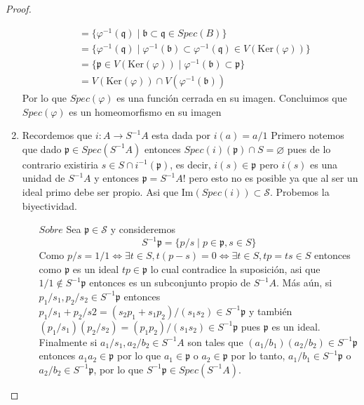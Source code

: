 \documentclass[14pt]{extarticle}
\begin{document}
\begin{proof}
\begin{enumerate}
\begin{align*}
            &=\{\varphi^{-1}(\mathfrak{q})\mid \mathfrak{b}\subset \mathfrak{q}\in Spec(B)\}\\
            &= \{\varphi^{-1}(\mathfrak{q})\mid \varphi^{-1}(\mathfrak{b}) \subset \varphi^{-1}(\mathfrak{q})\in V(\mbox{Ker}(\varphi))\}\\
            &= \{\mathfrak{p}\in V(\mbox{Ker}(\varphi))\mid \varphi^{-1}(\mathfrak{b}) \subset \mathfrak{p}\}\\
            &= V(\mbox{Ker}(\varphi))\cap V(\varphi^{-1}(\mathfrak{b}))
        \end{align*}
        Por lo que $Spec(\varphi)$ es una función cerrada en su imagen.
        Concluimos que $Spec(\varphi)$ es un homeomorfismo en su imagen
        \item Recordemos que $i:A\rightarrow S^{-1}A$ esta dada por $i(a)=a/1$ 
        Primero notemos que dado $\mathfrak{p}\in Spec(S^{-1}A)$ entonces
        $Spec(i)(\mathfrak{p})\cap S= \varnothing$ pues de lo contrario
        existiria $s\in S\cap i^{-1}(\mathfrak{p})$, es decir, $i(s)\in \mathfrak{p}$
        pero $i(s)$ es una unidad de $S^{-1}A$ y entonces $\mathfrak{p}=S^{-1}A$!
        pero esto no es posible ya que al ser un ideal primo debe ser propio.
        Asi que $\mbox{Im}(Spec(i))\subset \mathcal{S}$.
        Probemos la biyectividad.
        \begin{enumerate}
            \item[$Sobre$] Sea $\mathfrak{p} \in \mathcal{S}$ y consideremos 
            $$S^{-1}\mathfrak{p}=\{p/s\mid p\in\mathfrak{p}, s\in S\}$$
            Como $p/s=1/1\iff \exists t\in S, t(p-s)=0\iff \exists t\in S, tp=ts\in S$
            entonces como $\mathfrak{p}$ es un ideal $tp\in \mathfrak{p}$ lo cual 
            contradice la suposición, asi que $1/1 \notin S^{-1}\mathfrak{p}$
            entonces es un subconjunto propio de $S^{-1}A$. Más aún,
            si $p_1/s_1, p_2/s_2\in S^{-1}\mathfrak{p}$ entonces
            $p_1/s_1 + p_2/s2 = (s_2p_1+s_1p_2)/(s_1s_2)\in S^{-1}\mathfrak{p}$
            y también $(p_1/s_1)(p_2/s_2)= (p_1p_2)/(s_1s_2)\in S^{-1}\mathfrak{p}$
            pues $\mathfrak{p}$ es un ideal. Finalmente si $a_1/s_1, a_2/b_2 \in S^{-1}A$
            son tales que $(a_1/b_1)(a_2/b_2)\in S^{-1}\mathfrak{p}$ entonces $a_1a_2\in\mathfrak{p}$
            por lo que $a_1\in \mathfrak{p}$ o $a_2\in \mathfrak{p}$ por lo tanto,
            $a_1/b_1 \in S^{-1}\mathfrak{p}$ o $a_2/b_2 \in S^{-1}\mathfrak{p}$, 
            por lo que $S^{-1}\mathfrak{p}\in Spec(S^{-1}A)$.\\

\end{enumerate}
\end{enumerate}
\end{proof}
\end{document}
